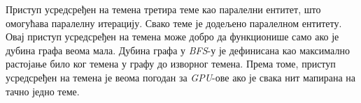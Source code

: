 \par
Приступ усредсређен на темена третира теме као паралелни ентитет, што омогућава паралелну итерацију. Свако теме је додељено паралелном ентитету. Овај приступ усредсређен на темена може добро да функционише само ако је дубина графа веома мала. Дубина графа у \textit{BFS}-у је дефинисана као максимално растојање било ког темена у графу до изворног темена. Према томе, приступ усредсређен на темена је веома погодан за \textit{GPU}-ове ако је свака нит мапирана на тачно једно теме.